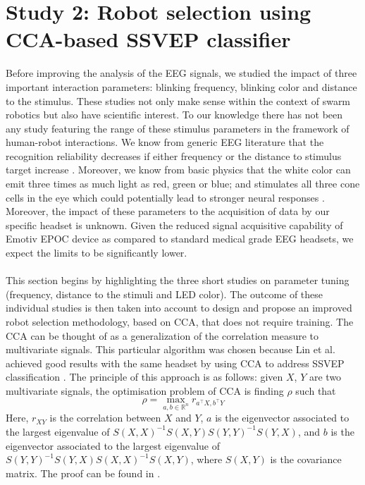 \documentclass{svmult}
\begin{document}
\section{Study 2: Robot selection using CCA-based SSVEP classifier}
\label{sec:CCA_approach}
Before improving the analysis of the EEG signals, we studied the impact of three important interaction parameters: blinking frequency, blinking color and distance to the stimulus. These studies not only make sense within the context of swarm robotics but also have scientific interest. To our knowledge there has not been any study featuring the range of these stimulus parameters in the framework of human-robot interactions. We know from generic EEG literature that the recognition reliability decreases if either frequency or the distance to stimulus target increase \cite{herrmann2001, wu2013effect}. Moreover, we know from basic physics that the white color can emit three times as much light as red, green or blue; and stimulates all three cone cells in the eye which could potentially lead to stronger neural responses \cite{aljshamee2016discriminate}. Moreover, the impact of these parameters to the acquisition of data by our specific headset is unknown. Given the reduced signal acquisitive capability of Emotiv EPOC device as compared to standard medical grade EEG headsets, we expect the limits to be significantly lower.\\
\\
This section begins by highlighting the three short studies on parameter tuning (frequency, distance to the stimuli and LED color). 
The outcome of these individual studies is then taken into account to design and propose an improved robot selection methodology, based on CCA, that does not require training. 
The CCA can be thought of as a generalization of the correlation measure to multivariate signals. 
This particular algorithm was chosen because Lin et al. achieved good results with the same headset by using CCA to address SSVEP classification \cite{Lin2014}. The principle of this approach is as follows: given $X$, $Y$ are two multivariate signals, the optimisation problem of CCA is finding $\rho$ such that
\\
\begin{equation}
\label{rho}
\rho = \max_{a, b \in \mathbb R^n}  r_{ a^\top X, b^\top Y}
\end{equation}
Here,  $r_{XY}$ is the correlation between $X$ and $Y$,  $a$ is the eigenvector associated to the largest eigenvalue of $S(X, X)^{-1} S(X,Y) S(Y, Y)^{-1} S(Y, X)$, and $b$ is the eigenvector associated to the largest eigenvalue of $S(Y, Y)^{-1} S(Y, X) S(X, X)^{-1} S(X, Y)$, where $S(X, Y)$ is the covariance matrix. The proof  can be found in \cite{rencher2003}.
\end{document}
